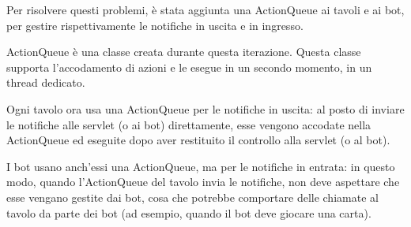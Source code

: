   Per risolvere questi problemi, \`e stata aggiunta una ActionQueue ai tavoli
  e ai bot, per gestire rispettivamente le notifiche in uscita e in ingresso.

  ActionQueue \`e una classe creata durante questa iterazione. Questa classe
  supporta l'accodamento di azioni e le esegue in un secondo momento, in un
  thread dedicato.

  Ogni tavolo ora usa una ActionQueue per le notifiche in uscita:
  al posto di inviare le notifiche alle servlet (o ai bot) direttamente, esse
  vengono accodate nella ActionQueue ed eseguite dopo aver restituito il
  controllo alla servlet (o al bot).

  I bot usano anch'essi una ActionQueue, ma per le notifiche in entrata:
  in questo modo, quando l'ActionQueue del tavolo invia le notifiche, non
  deve aspettare che esse vengano gestite dai bot, cosa che potrebbe
  comportare delle chiamate al tavolo da parte dei bot (ad esempio, quando
  il bot deve giocare una carta).

